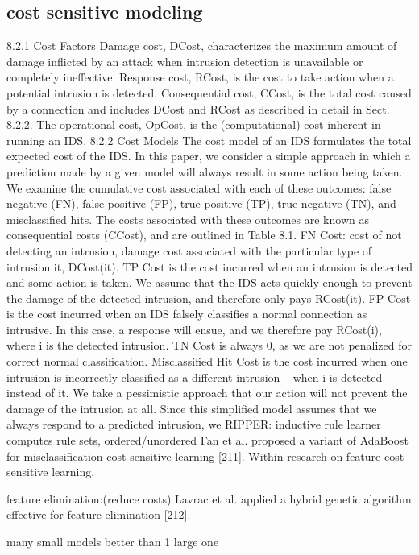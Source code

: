 \documentclass[12pt]{article}
\begin{document}
\subsection{cost sensitive modeling}
8.2.1 Cost Factors
Damage cost, DCost, characterizes the maximum amount of damage inflicted
by an attack when intrusion detection is unavailable or completely ineffective.
Response cost, RCost, is the cost to take action when a potential intrusion
is detected.
Consequential cost, CCost, is the total cost caused by a connection
and includes DCost and RCost as described in detail in Sect. 8.2.2. The
operational cost, OpCost, is the (computational) cost inherent in running an
IDS.
8.2.2 Cost Models
The cost model of an IDS formulates the total expected cost of the IDS. In
this paper, we consider a simple approach in which a prediction made by a
given model will always result in some action being taken. We examine the
cumulative cost associated with each of these outcomes: false negative (FN),
false positive (FP), true positive (TP), true negative (TN), and misclassified
hits. The costs associated with these outcomes are known as consequential
costs (CCost), and are outlined in Table 8.1.
FN Cost: cost of not detecting an intrusion, damage cost associated with the particular type of intrusion it, DCost(it).
TP Cost is the cost incurred when an intrusion is detected and some action
is taken. We assume that the IDS acts quickly enough to prevent the damage
of the detected intrusion, and therefore only pays RCost(it).
FP Cost is the cost incurred when an IDS falsely classifies a normal connection
as intrusive. In this case, a response will ensue, and we therefore pay
RCost(i), where i is the detected intrusion.
TN Cost is always 0, as we are not penalized for correct normal classification.
Misclassified Hit Cost is the cost incurred when one intrusion is incorrectly
classified as a different intrusion – when i is detected instead of it. We take
a pessimistic approach that our action will not prevent the damage of the
intrusion at all. Since this simplified model assumes that we always respond
to a predicted intrusion, we
RIPPER: inductive rule learner
      computes rule sets, ordered/unordered
Fan et al. proposed
a variant of AdaBoost for misclassification cost-sensitive learning [211].
Within research on feature-cost-sensitive learning,

feature elimination:(reduce costs)
Lavrac et al. applied a hybrid
genetic algorithm effective for feature elimination [212].

many small models better than 1 large one
\end{document}
